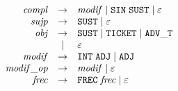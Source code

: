 \[\begin{array}{rcl}
  \mathit{compl} & \to & \mathit{modif} \mid \mathtt{SIN}\;\mathtt{SUST} \mid \varepsilon \\
  \mathit{sujp} & \to & \mathtt{SUST} \mid \varepsilon \\
  \mathit{obj} & \to & \mathtt{SUST} \mid \mathtt{TICKET} \mid \mathtt{ADV\_T} \\
   & \mid & \varepsilon \\
  \mathit{modif} & \to & \mathtt{INT}\;\mathtt{ADJ} \mid \mathtt{ADJ} \\
  \mathit{modif\_op} & \to & \mathit{modif} \mid \varepsilon \\
  \mathit{frec} & \to & \mathtt{FREC}\;\mathit{frec} \mid \varepsilon \\
\end{array}
\]
